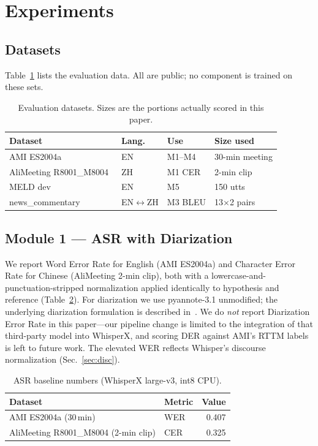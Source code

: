 \documentclass[11pt,a4paper]{article}
\begin{document}
\section{Experiments}
\label{sec:exp}

\subsection{Datasets}
Table~\ref{tab:datasets} lists the evaluation data. All are public;
no component is trained on these sets.

\begin{table}[h]
\centering
\footnotesize
\caption{Evaluation datasets. Sizes are the portions actually
scored in this paper.}
\label{tab:datasets}
\setlength{\tabcolsep}{4pt}
\begin{tabular}{@{}llll@{}}
\toprule
Dataset & Lang. & Use & Size used \\
\midrule
AMI ES2004a~\cite{carletta2006ami} & EN & M1--M4 & 30-min meeting \\
AliMeeting R8001\_M8004~\cite{yu2022m2met} & ZH & M1 CER & 2-min clip \\
MELD dev~\cite{poria2019meld} & EN & M5 & 150 utts \\
news\_commentary & EN$\leftrightarrow$ZH & M3 BLEU & 13$\times$2 pairs \\
\bottomrule
\end{tabular}
\end{table}

\subsection{Module 1 --- ASR with Diarization}
\label{sec:m1}
We report Word Error Rate for English (AMI ES2004a) and Character
Error Rate for Chinese (AliMeeting 2-min clip), both with a
lowercase-and-punctuation-stripped normalization applied identically
to hypothesis and reference (Table~\ref{tab:asr}). For diarization we
use pyannote-3.1 unmodified; the underlying diarization formulation
is described in~\cite{plaquet23powerset}. We do \emph{not} report
Diarization Error Rate in this paper---our pipeline change is
limited to the integration of that third-party model into WhisperX,
and scoring DER against AMI's RTTM labels is left to future work.
The elevated WER reflects Whisper's discourse normalization
(Sec.~\ref{sec:disc}).

\begin{table}[h]
\centering
\footnotesize
\caption{ASR baseline numbers (WhisperX large-v3, int8 CPU).}
\label{tab:asr}
\begin{tabular}{llr}
\toprule
Dataset & Metric & Value \\
\midrule
AMI ES2004a (30\,min) & WER & 0.407 \\
AliMeeting R8001\_M8004 (2-min clip) & CER & 0.325 \\
\bottomrule
\end{tabular}
\end{table}
\end{document}
